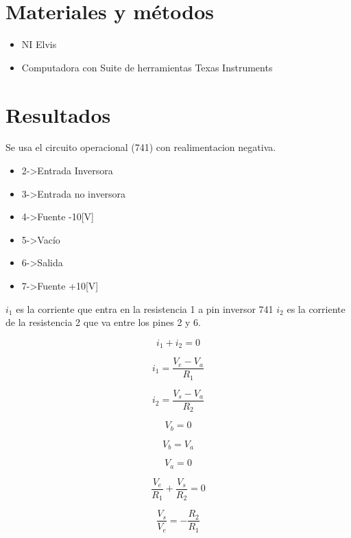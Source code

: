 \documentclass[]{article}
\begin{document}
\section{Materiales y métodos}

	\begin{itemize}
		\item NI Elvis
		\item Computadora con Suite de herramientas Texas Instruments
	\end{itemize}
	
\section{Resultados}



Se usa el circuito operacional (741) con realimentacion negativa.\\


\begin{itemize}

	\item 2->Entrada Inversora
	\item 3->Entrada no inversora
	\item 4->Fuente -10[V]
	\item 5->Vacío
	\item 6->Salida
	\item 7->Fuente +10[V]
\end{itemize}


$i_1$ es la corriente que entra en la resistencia 1 a pin inversor 741
$i_2$ es la corriente de la resistencia 2 que va entre los pines 2 y 6.\\

\begin{multicols}{2}

\begin{equation}
   i_1+i_2=0
\end{equation}

\begin{equation}
    i_1=\frac{V_e-V_a}{R_1}
\end{equation}

\begin{equation}
   i_2=\frac{V_s-V_a}{R_2}
\end{equation}

\begin{equation}
    V_b=0
\end{equation}

\begin{equation}
    V_b=V_a
\end{equation}

\begin{equation}
    V_a=0
\end{equation}

\begin{equation}
    \frac{V_e}{R_1}+\frac{V_s}{R_2}=0
\end{equation}

\begin{equation}
   \frac{V_s}{V_e}=-\frac{R_2}{R_1}
\end{equation}

\end{multicols}
\end{document}
